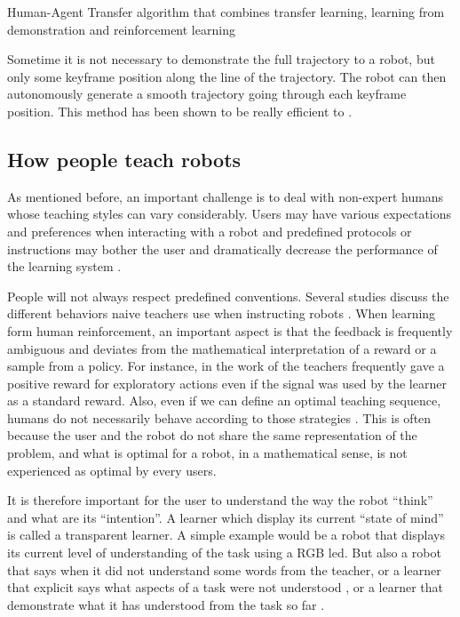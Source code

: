 \cite{taylor2011integrating} Human-Agent Transfer algorithm that combines transfer learning, learning from demonstration and reinforcement learning

Sometime it is not necessary to demonstrate the full trajectory to a robot, but only some keyframe position along the line of the trajectory. The robot can then autonomously generate a smooth trajectory going through each keyframe position. This method has been shown to be really efficient to  \cite{akgun12hri}. 

\subsection{How people teach robots}

As mentioned before, an important challenge is to deal with non-expert humans whose teaching styles can vary considerably. Users may have various expectations and preferences when interacting with a robot and predefined protocols or instructions may bother the user and dramatically decrease the performance of the learning system \cite{thomaz2008teachable,rouanet2013impact}.

People will not always respect predefined conventions. Several studies discuss the different behaviors naive teachers use when instructing robots \cite{thomaz2008teachable,Cakmak2010optimality}. When learning form human reinforcement, an important aspect is that the feedback is frequently ambiguous and deviates from the mathematical interpretation of a reward or a sample from a policy. For instance, in the work of \cite{thomaz2008teachable} the teachers frequently gave a positive reward for exploratory actions even if the signal was used by the learner as a standard reward. Also, even if we can define an optimal teaching sequence, humans do not necessarily behave according to those strategies \cite{Cakmak2010optimality}. This is often because the user and the robot do not share the same representation of the problem, and what is optimal for a robot, in a mathematical sense, is not experienced as optimal by every users. 

It is therefore important for the user to understand the way the robot ``think'' and what are its ``intention''. A learner which display its current ``state of mind'' is called a transparent learner. A simple example would be a robot that displays its current level of understanding of the task using a RGB led. But also a robot that says when it did not understand some words from the teacher, or a learner that explicit says what aspects of a task were not understood \cite{chao2010transparent}, or a learner that demonstrate what it has understood from the task so far \cite{cakmak2012designing}. 


